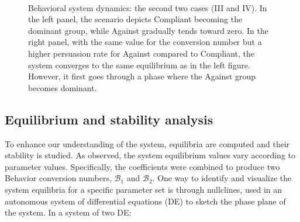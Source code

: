 \begin{figure}[h]
	\centering
	 \quad
	 \\
		\caption[Behavioral model simulation second]{Behavioral system dynamics: the second two cases (III and IV). In the left panel, the scenario depicts Compliant becoming the dominant group, while Against gradually tends toward zero. In the right panel, with the same value for the conversion number but a higher persuasion rate for Against compared to Compliant, the system converges to the same equilibrium as in the left figure. However, it first goes through a phase where the Against group becomes dominant.}
	\label{fig:model__behavior_sim_2}
\end{figure}

\subsection{Equilibrium and stability analysis}
To enhance our understanding of the system, equilibria are computed and their stability is studied. As observed, the system equilibrium values vary according to parameter values. Specifically, the coefficients were combined to produce two Behavior conversion numbers, $\mathcal{B}_1$ and $\mathcal{B}_2$. One way to identify and visualize the system equilibria for a specific parameter set is through nullclines, used in an autonomous system of differential equations (DE)  to sketch the phase plane of the system. In a system of two DE: 
  
